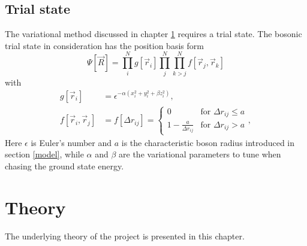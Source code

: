 \documentclass[a4paper,8pt]{article}
\begin{document}
\begin{multicols}{2}
\subsection{Trial state}
The variational method discussed in chapter \ref{theory} requires a trial state. The bosonic trial state in consideration has the position basis form
\begin{equation}\label{trialstate}
\Psi[\vec{R}] = \prod\limits_i^N g[\vec{r}_i] \prod\limits_j^N\prod\limits_{k > j}^N f[\vec{r}_j,\vec{r}_k]
\end{equation}
with
\begin{align}
g[\vec{r}_i] &= \epsilon^{-\alpha\left(x_i^2+y_i^2+ \beta z_i^2\right)}, \label{g}\\
f[\vec{r}_i,\vec{r}_j] &= f[\Delta{r}_{ij}] = \begin{cases} 0 & \text{for $\Delta{r}_{ij} \leq a$} \\
1-\frac{a}{\Delta{r}_{ij}} & \text{for $\Delta{r}_{ij} > a$} \end{cases}, \label{f}
\end{align}
Here $\epsilon$ is Euler's number and $a$ is the characteristic boson radius introduced in section \ref{model}, while $\alpha$ and $\beta$ are the variational parameters to tune when chasing the ground state energy.



\section{Theory}\label{theory}
The underlying theory of the project is presented in this chapter.



\end{multicols}
\end{document}
